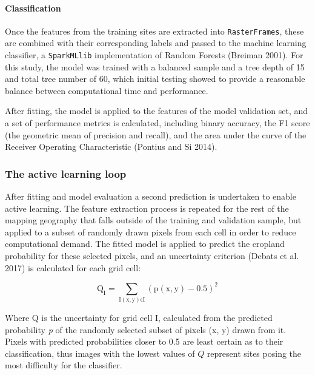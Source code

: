 \documentclass[11pt,a4paper]{article}
\begin{document}
\hypertarget{classification}{%
\paragraph{Classification}\label{classification}}

Once the features from the training sites are extracted into
\texttt{RasterFrames}, these are combined with their corresponding
labels and passed to the machine learning classifier, a
\texttt{SparkMLlib} implementation of Random Forests (Breiman 2001). For
this study, the model was trained with a balanced sample and a tree
depth of 15 and total tree number of 60, which initial testing showed to
provide a reasonable balance between computational time and performance.

After fitting, the model is applied to the features of the model
validation set, and a set of performance metrics is calculated,
including binary accuracy, the F1 score (the geometric mean of precision
and recall), and the area under the curve of the Receiver Operating
Characteristic (Pontius and Si 2014).

\hypertarget{the-active-learning-loop}{%
\subsubsection{The active learning
loop}\label{the-active-learning-loop}}

After fitting and model evaluation a second prediction is undertaken to
enable active learning. The feature extraction process is repeated for
the rest of the mapping geography that falls outside of the training and
validation sample, but applied to a subset of randomly drawn pixels from
each cell in order to reduce computational demand. The fitted model is
applied to predict the cropland probability for these selected pixels,
and an uncertainty criterion (Debats et al. 2017) is calculated for each
grid cell:

\begin{equation}
\mathrm{Q_I = \sum_{I(x, y) \epsilon I} (p(x, y) - 0.5)^2}
\end{equation}

Where Q is the uncertainty for grid cell I, calculated from the
predicted probability \emph{p} of the randomly selected subset of pixels
(x, y) drawn from it. Pixels with predicted probabilities closer to 0.5
are least certain as to their classification, thus images with the
lowest values of \(Q\) represent sites posing the most difficulty for
the classifier.
\end{document}
